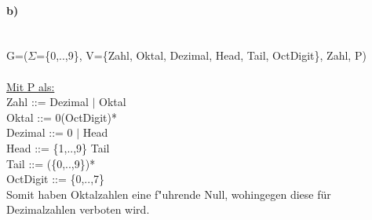 \documentclass[12pt]{article}
\begin{document}
\paragraph{b)}\ \\
	G=($\Sigma$=\{0,..,9\}, V=\{Zahl, Oktal, Dezimal, Head, Tail, OctDigit\}, Zahl, P)\\
	\ \\
	\noindent \underline{Mit P als:}\\
	Zahl ::= Dezimal $|$ Oktal\\
	Oktal ::= 0(OctDigit)*\\
	Dezimal ::= 0 $|$ Head\\
	Head ::= \{1,..,9\} Tail\\
	Tail ::= (\{0,..,9\})*\\
	OctDigit ::= \{0,..,7\}\\	
	
	\noindent Somit haben Oktalzahlen eine f"uhrende Null, wohingegen diese f\"ur Dezimalzahlen verboten wird.
	
\end{document}
